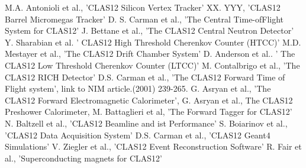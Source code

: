 \documentclass[final,3p,twocolumn]{elsarticle}
\begin{document}
\begin{thebibliography}{99}
 M.A. Antonioli et al., 'CLAS12 Silicon Vertex Tracker' 
 XX. YYY, 'CLAS12 Barrel Micromegas Tracker' 
 D. S. Carman et al., 'The Central Time-ofFlight System for CLAS12' 
 J. Bettane et al., 'The CLAS12 Central Neutron Detector'
 Y. Sharabian et al.  ' CLAS12 High Threshold Cherenkov Counter (HTCC)' 
 M.D. Mestayer et al., 'The CLAS12 Drift Chamber System'
 D. Anderson et al.. ' The CLAS12 Low Threshold Cherenkov Counter (LTCC)' 
 M. Contalbrigo et al., 'The CLAS12 RICH Detector'  
 D.S. Carman et al., 'The CLAS12 Forward Time of Flight system', link to NIM article.(2001) 239-265.
 G. Asryan et al., 'The CLAS12 Forward Electromagnetic Calorimeter', 
 G. Asryan et al.,  The CLAS12 Preshower Calorimeter,
 M. Battaglieri et al, 'The Forward Tagger for CLAS12' 
 N. Baltzell et al., 'CLAS12 Beamline and ist Performance' 
 S. Boiarinov et al., 'CLAS12 Data Acquisition System' 
 D.S. Carman et al., 'CLAS12 Geant4 Simulations' 
 V. Ziegler et al., 'CLAS12 Event Reconstruction Software' 
 R. Fair et al., 'Superconducting magnets for CLAS12'
\end{thebibliography}

\end{document}
